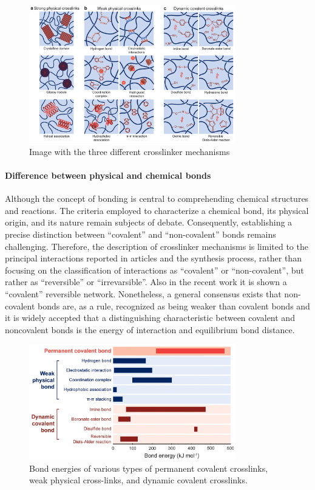 \begin{figure}[!ht]
    \centering
    \includegraphics[width=0.8\textwidth]{figs/crosslinker_mechanisms.png}
    \caption{Image with the three different crosslinker mechanisms}
\end{figure}


\paragraph{Difference between physical and chemical bonds}
Although the concept of bonding is central to comprehending chemical structures and reactions.
The criteria employed to characterize a chemical bond, its physical origin, and its nature remain subjects of debate\citep{kumarDevelopingCriterionCharacterize2021}.
Consequently, establishing a precise distinction between ``covalent'' and ``non-covalent'' bonds remains challenging.
Therefore, the description of crosslinker mechanisms is limited to the principal interactions reported in articles and the synthesis process, rather than focusing on the classification of interactions as ``covalent'' or ``non-covalent'', but rather as ``reversible'' or ``irrevarsible''.
Also in the recent work \citep{picchioniHydrogelsBasedDynamic2018} it is shown a ``covalent'' reversible network. 
Nonetheless, a general consensus exists that non-covalent bonds are, as a rule, recognized as being weaker than covalent bonds and it is widely accepted that a distinguishing characteristic between covalent and noncovalent bonds is the energy of interaction and equilibrium bond distance\citep{kumarDevelopingCriterionCharacterize2021,novikovNonCovalentInteractionsPolymers2023}.

\begin{figure}[!ht]
    \centering
    \includegraphics[width=0.8\textwidth]{figs/bonds_energy.png}
    \caption{Bond energies of various types of permanent covalent crosslinks, weak physical cross-links, and dynamic covalent crosslinks.}
\end{figure}

